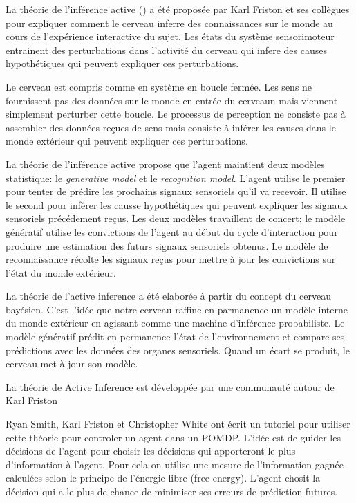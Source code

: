La théorie de l'inférence active () a été proposée par Karl Friston et ses collègues pour expliquer comment le cerveau inferre des connaissances sur le monde au cours de l'expérience interactive du sujet. 
Les états du système sensorimoteur entrainent des perturbations dans l'activité du cerveau qui infere des causes hypothétiques qui peuvent expliquer ces perturbations.

Le cerveau est compris comme en système en boucle fermée.
Les sens ne fournissent pas des données sur le monde en entrée du cerveaun mais viennent simplement perturber cette boucle. 
Le processus de perception ne consiste pas à assembler des données reçues de sens mais consiste à inférer les causes dans le monde extérieur qui peuvent expliquer ces perturbations.

La théorie de l'inférence active propose que l'agent maintient deux modèles statistique: le \emph{generative model} et le \emph{recognition model}.
L'agent utilise le premier pour tenter de prédire les prochains signaux sensoriels qu'il va recevoir.
Il utilise le second pour inférer les causse hypothétiques qui peuvent expliquer les signaux sensoriels précédement reçus. 
Les deux modèles travaillent de concert: le modèle génératif utilise les convictions de l'agent au début du cycle d'interaction pour produire une estimation des futurs signaux sensoriels obtenus. 
Le modèle de reconnaissance récolte les signaux reçus pour mettre à jour les convictions sur l'état du monde extérieur.    




La théorie de l'active inference a été elaborée à partir du concept du cerveau bayésien. 
C'est l'idée que notre cerveau raffine en parmanence un modèle interne du monde extérieur en agissant comme une machine d'inférence probabiliste. 
Le modèle génératif prédit en permanence l'état de l'environnement et compare ses prédictions avec les données des organes sensoriels. Quand un écart se produit, le cerveau met à jour son modèle.

La théorie de Active Inference est développée par une communauté autour de 
Karl Friston \cite{friston_active_2017} 

Ryan Smith, Karl Friston et Christopher White ont écrit un tutoriel \cite{smith_step-by-step_2022} pour utiliser cette théorie pour controler un agent dans un POMDP. 
L'idée est de guider les décisions de l'agent pour choisir les décisions qui apporteront le plus d'information à l'agent. 
Pour cela on utilise une mesure de l'information gagnée calculées selon le principe de l'énergie libre (free energy).
L'agent chosit la décision qui a le plus de chance de minimiser ses erreurs de prédiction futures. 

